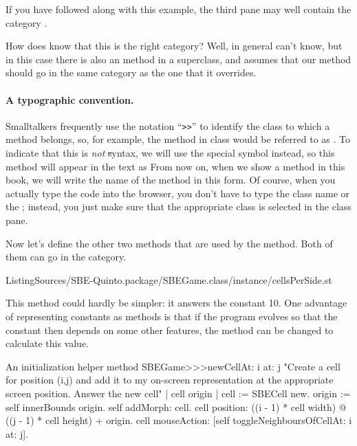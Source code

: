 \documentclass[a4paper,10pt,twoside]{book}
\begin{document}
If you have followed along with this example, the third pane may well contain the category .

How does \squeak{} know that this is the right category?  Well, in general \squeak{} can't know, but in this case there is also an  method in a superclass, and \squeak assumes that our  method should go in the same category as the one that it overrides.

\paragraph{A typographic convention.} Smalltalkers frequently use the notation ``\verb|>>|'' to identify the class to which a method belongs, so, for example, the  method in class  would be referred to as .
To indicate that this is \emph{not} \st syntax, we will use the special symbol \ct{>>>} instead, so this method will appear in the text as 
From now on, when we show a method in this book, we will write the name of the method in this form.  Of course, when you actually type the code into the browser, you don't have to type the class name or the \ct{>>>}; instead, you just make sure that the appropriate class is selected in the class pane.  

Now let's define the other two methods that are used by the  method. Both of them can go in the  category.

%
{ListingSources/SBE-Quinto.package/SBEGame.class/instance/cellsPerSide.st}	

This method could hardly be simpler: it answers the constant 10.  One advantage of representing constants as methods is that if the program evolves so that the constant then depends on some other features, the method can be changed to calculate this value.

\begin{method}[newCellAt:at:]{An initialization helper method}
SBEGame>>>newCellAt: i at: j 
	"Create a cell for position (i,j) and add it to my on-screen
	representation at the appropriate screen position.  Answer the new cell"
	| cell origin |
	cell := SBECell new.
	origin := self innerBounds origin.
	self addMorph: cell.
	cell position: ((i - 1) * cell width) @ ((j - 1) * cell height) + origin.
	cell mouseAction: [self toggleNeighboursOfCellAt: i at: j].
\end{method}
\end{document}
